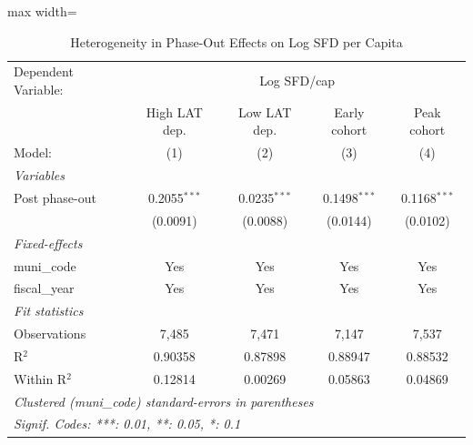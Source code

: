 
\begin{table}[htbp]
   \caption{\label{tab:heterogeneity} Heterogeneity in Phase-Out Effects on Log SFD per Capita}
   \centering
   \begin{adjustbox}{max width=\textwidth}
   \begin{tabular}{lcccc}
      \tabularnewline \midrule \midrule
      Dependent Variable: & \multicolumn{4}{c}{Log SFD/cap}\\
                     & High LAT dep.  & Low LAT dep.   & Early cohort   & Peak cohort \\   
      Model:         & (1)            & (2)            & (3)            & (4)\\  
      \midrule
      \emph{Variables}\\
      Post phase-out & 0.2055$^{***}$ & 0.0235$^{***}$ & 0.1498$^{***}$ & 0.1168$^{***}$\\   
                     & (0.0091)       & (0.0088)       & (0.0144)       & (0.0102)\\   
      \midrule
      \emph{Fixed-effects}\\
      muni\_code     & Yes            & Yes            & Yes            & Yes\\  
      fiscal\_year   & Yes            & Yes            & Yes            & Yes\\  
      \midrule
      \emph{Fit statistics}\\
      Observations   & 7,485          & 7,471          & 7,147          & 7,537\\  
      R$^2$          & 0.90358        & 0.87898        & 0.88947        & 0.88532\\  
      Within R$^2$   & 0.12814        & 0.00269        & 0.05863        & 0.04869\\  
      \midrule \midrule
      \multicolumn{5}{l}{\emph{Clustered (muni\_code) standard-errors in parentheses}}\\
      \multicolumn{5}{l}{\emph{Signif. Codes: ***: 0.01, **: 0.05, *: 0.1}}\\
   \end{tabular}
   \end{adjustbox}
\end{table}


